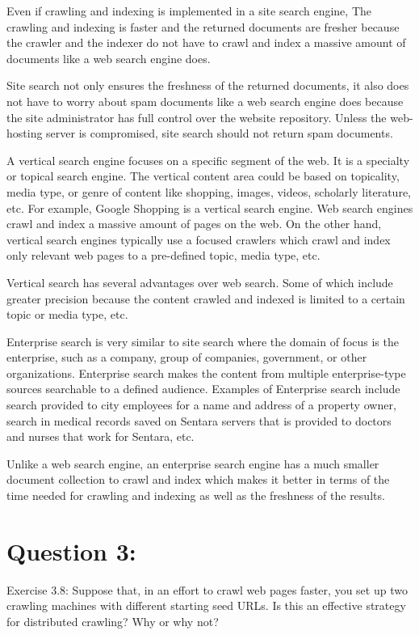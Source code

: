 \documentclass[a4paper, 11pt]{article}
\begin{document}
Even if crawling and indexing is implemented in a site search engine, The crawling and indexing is faster and the returned documents are fresher because the crawler and the indexer do not have to crawl and index a massive amount of documents like a web search engine does.

Site search not only ensures the freshness of the returned documents, it also does not have to worry about spam documents like a web search engine does because the site administrator has full control over the website repository. Unless the web-hosting server is compromised, site search should not return spam documents.

A vertical search engine focuses on a specific segment of the web. It is a specialty or topical search engine. The vertical content area could be based on topicality, media type, or genre of content like shopping, images, videos, scholarly literature, etc. For example, Google Shopping is a vertical search engine. Web search engines crawl and index a massive amount of pages on the web. On the other hand, vertical search engines typically use a focused crawlers which crawl and index only relevant web pages to a pre-defined topic, media type, etc.

Vertical search has several advantages over web search. Some of which include greater precision because the content crawled and indexed is limited to a certain topic or media type, etc.

Enterprise search is very similar to site search where the domain of focus is the enterprise, such as a company, group of companies, government, or other organizations. Enterprise search makes the content from multiple enterprise-type sources searchable to a defined audience. Examples of Enterprise search include search provided to city employees for a name and address of a property owner, search in medical records saved on Sentara servers  that is provided to doctors and nurses that work for Sentara, etc.

Unlike a web search engine, an enterprise search engine has a much smaller document collection to crawl and index which makes it better in terms of the time needed for crawling and indexing as well as the freshness of the results.

\section*{Question 3:}
Exercise 3.8: Suppose that, in an effort to crawl web pages faster, you set up two crawling
machines with different starting seed URLs. Is this an effective strategy for
distributed crawling? Why or why not?
\end{document}

